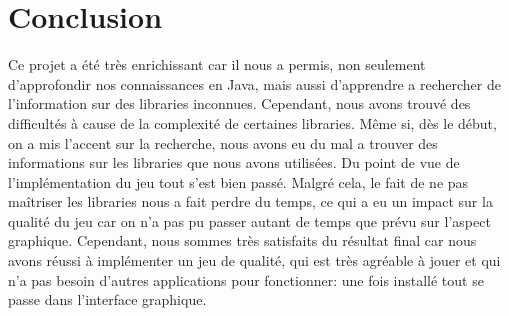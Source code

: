 \section{Conclusion}
\label{sec:conclusion}

Ce projet a été très enrichissant car il nous a permis, non seulement d'approfondir nos connaissances en Java, mais aussi d'apprendre a rechercher de
l'information sur des libraries inconnues. Cependant, nous avons trouvé des difficultés à cause de la complexité de certaines libraries. Même si, dès le début,
on a mis l'accent sur la recherche, nous avons eu du mal a trouver des informations sur les libraries que nous avons utilisées. Du point de vue de
l'implémentation du jeu tout s'est bien passé. Malgré cela, le fait de ne pas maîtriser les libraries nous a fait perdre du temps, ce qui a eu un impact sur la
qualité du jeu car on n'a pas pu passer autant de temps que prévu sur l'aspect graphique. Cependant, nous sommes très satisfaits du résultat final car nous
avons réussi à implémenter un jeu de qualité, qui est très agréable à jouer et qui n'a pas besoin d'autres applications pour fonctionner: une fois installé
tout se passe dans l'interface graphique.

